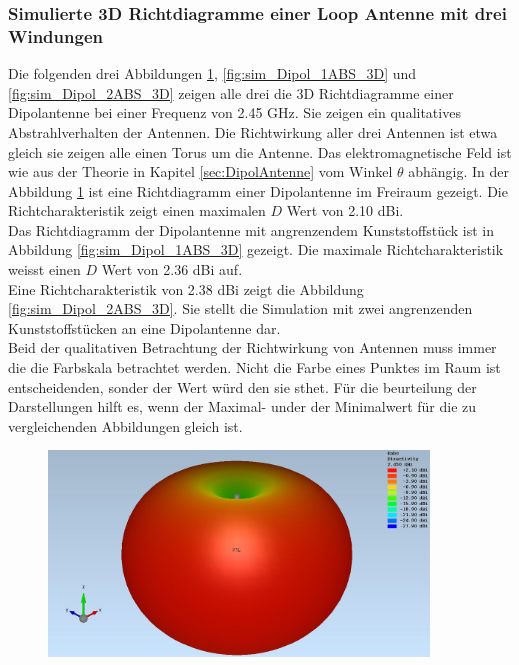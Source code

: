 \subsubsection{Simulierte 3D Richtdiagramme einer Loop Antenne mit drei Windungen}
Die folgenden drei Abbildungen \ref{fig:sim_Dipol_Freiraum_3D},
\ref{fig:sim_Dipol_1ABS_3D} und 
\ref{fig:sim_Dipol_2ABS_3D} zeigen alle drei die 3D Richtdiagramme einer Dipolantenne bei einer Frequenz von 2.45 GHz. Sie zeigen ein qualitatives Abstrahlverhalten der Antennen. Die Richtwirkung aller drei Antennen ist etwa gleich sie zeigen alle einen Torus um die Antenne. Das elektromagnetische Feld ist wie aus der Theorie in Kapitel \ref{sec:DipolAntenne} vom Winkel $\theta$ abhängig.
In der Abbildung \ref{fig:sim_Dipol_Freiraum_3D} ist eine Richtdiagramm einer Dipolantenne im Freiraum gezeigt. Die Richtcharakteristik zeigt einen maximalen $D$ Wert  von 2.10 dBi.\\
Das Richtdiagramm der Dipolantenne mit angrenzendem Kunststoffstück ist in Abbildung \ref{fig:sim_Dipol_1ABS_3D} gezeigt. Die maximale Richtcharakteristik weisst einen $D$ Wert von 2.36 dBi auf.\\
Eine Richtcharakteristik von 2.38 dBi zeigt die Abbildung \ref{fig:sim_Dipol_2ABS_3D}. Sie stellt die Simulation mit zwei angrenzenden Kunststoffstücken an eine Dipolantenne dar.\\
Beid der qualitativen Betrachtung der Richtwirkung von Antennen muss immer die die Farbskala betrachtet werden. Nicht die Farbe eines Punktes im Raum ist entscheidenden, sonder der Wert würd den sie sthet. Für die beurteilung der Darstellungen hilft es, wenn der Maximal- under der Minimalwert für die zu vergleichenden Abbildungen gleich ist.
\begin{figure}[h]
	\begin{center}
		\includegraphics[width=0.9\textwidth]{content/bilder/Evaluation/Dipol/3D_Dipol_Freiraum.JPG}
		\label{fig:sim_Dipol_Freiraum_3D}
	\end{center}
\end{figure}
